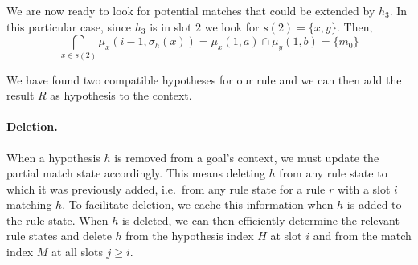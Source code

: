 \documentclass[runningheads]{llncs}
\begin{document}

We are now ready to look for potential matches that could be extended by $h_3$.
In this particular case, since $h_3$ is in slot $2$ we look for $s(2) = \{x,y\}$.
Then,
\[
\bigcap_{x\in s(2)} \mu_x \left(i - 1, \sigma_h(x)\right) = \mu_x(1, a) \cap \mu_y(1, b) = \{m_0\}
\]

We have found two compatible hypotheses for our rule and we can then add the result $R$ as hypothesis to the context.

\paragraph{Deletion.}
When a hypothesis $h$ is removed from a goal's context, we must update the partial match state accordingly.
This means deleting $h$ from any rule state to which it was previously added, i.e.\ from any rule state for a rule $r$ with a slot $i$ matching $h$.
To facilitate deletion, we cache this information when $h$ is added to the rule state.
When $h$ is deleted, we can then efficiently determine the relevant rule states and delete $h$ from the hypothesis index $H$ at slot $i$ and from the match index $M$ at all slots $j ≥ i$.
\end{document}
